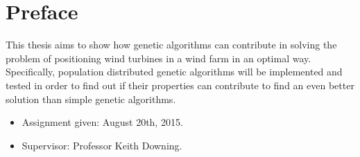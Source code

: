 \section*{Preface}
This thesis aims to show how genetic algorithms can contribute in solving the problem of positioning wind turbines in a wind farm in an optimal way. Specifically, population distributed genetic algorithms will be implemented and tested in order to find out if their properties can contribute to find an even better solution than simple genetic algorithms.


\begin{itemize}
\item Assignment given: August 20th, 2015.
\item Supervisor: Professor Keith Downing.
\end{itemize}